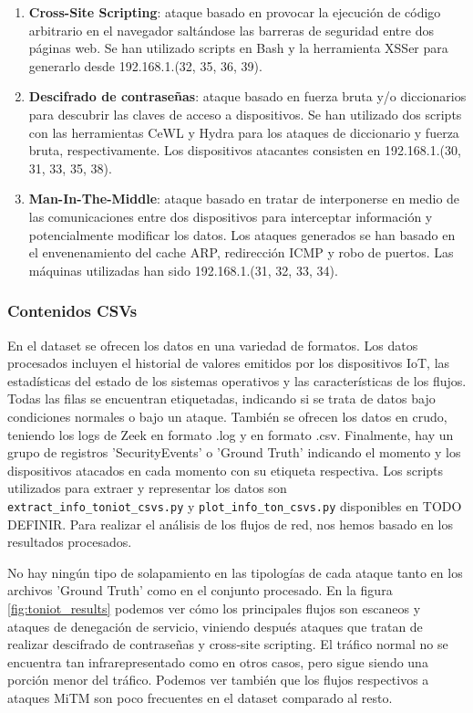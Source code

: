 \begin{enumerate}
  \item \textbf{Cross-Site Scripting}: ataque basado en provocar la ejecución de código arbitrario en el navegador saltándose las barreras de seguridad entre dos páginas web. Se han utilizado scripts en Bash y la herramienta XSSer para generarlo desde 192.168.1.(32, 35, 36, 39).
  \item \textbf{Descifrado de contraseñas}: ataque basado en fuerza bruta y/o diccionarios para descubrir las claves de acceso a dispositivos. Se han utilizado dos scripts con las herramientas CeWL y Hydra para los ataques de diccionario y fuerza bruta, respectivamente. Los dispositivos atacantes consisten en 192.168.1.(30, 31, 33, 35, 38).
  \item \textbf{Man-In-The-Middle}: ataque basado en tratar de interponerse en medio de las comunicaciones entre dos dispositivos para interceptar información y potencialmente modificar los datos. Los ataques generados se han basado en el envenenamiento del cache ARP, redirección ICMP y robo de puertos. Las máquinas utilizadas han sido 192.168.1.(31, 32, 33, 34).
\end{enumerate}

\subsubsection{Contenidos CSVs}

En el dataset se ofrecen los datos en una variedad de formatos. Los datos procesados incluyen el historial de valores emitidos por los dispositivos IoT, las estadísticas del estado de los sistemas operativos y las características de los flujos. Todas las filas se encuentran etiquetadas, indicando si se trata de datos bajo condiciones normales o bajo un ataque. También se ofrecen los datos en crudo, teniendo los logs de Zeek en formato .log y en formato .csv. Finalmente, hay un grupo de registros 'SecurityEvents' o 'Ground Truth' indicando el momento y los dispositivos atacados en cada momento con su etiqueta respectiva. Los scripts utilizados para extraer y representar los datos son \texttt{extract\_info\_toniot\_csvs.py} y \texttt{plot\_info\_ton\_csvs.py} disponibles en TODO DEFINIR. Para realizar el análisis de los flujos de red, nos hemos basado en los resultados procesados.

No hay ningún tipo de solapamiento en las tipologías de cada ataque tanto en los archivos 'Ground Truth' como en el conjunto procesado. En la figura \ref{fig:toniot_results} podemos ver cómo los principales flujos son escaneos y ataques de denegación de servicio, viniendo después ataques que tratan de realizar descifrado de contraseñas y cross-site scripting. El tráfico normal no se encuentra tan infrarepresentado como en otros casos, pero sigue siendo una porción menor del tráfico. Podemos ver también que los flujos respectivos a ataques MiTM son poco frecuentes en el dataset comparado al resto.


